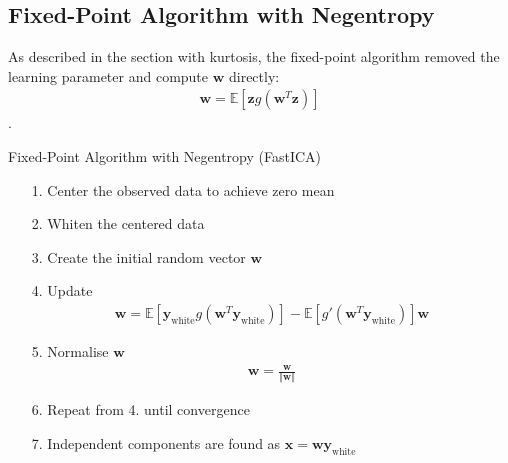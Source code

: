 \subsection{Fixed-Point Algorithm with Negentropy}
As described in the section with kurtosis, the fixed-point algorithm removed the learning parameter and compute $\mathbf{w}$ directly:
\begin{align*}
\mathbf{w} = \mathbb{E}[\mathbf{z} g(\mathbf{w}^T \mathbf{z})]
\end{align*}
.
\begin{algorithm}[H]
\caption{Fixed-Point Algorithm with Negentropy (FastICA)}
\begin{itemize}
\item[1.] Center the observed data to achieve zero mean
\item[2.] Whiten the centered data
\item[3.] Create the initial random vector $\mathbf{w}$
\item[4.] Update
\begin{align*}
\mathbf{w} = \mathbb{E}[ \mathbf{y}_{\text{white}} g(\mathbf{w}^T \mathbf{y}_{\text{white}})] - \mathbb{E}[g'(\mathbf{w}^T \mathbf{y}_{\text{white}})] \mathbf{w}
\end{align*}
\item[5.] Normalise $\mathbf{w}$
\begin{align*}
\mathbf{w} = \frac{\mathbf{w}}{\Vert \mathbf{w} \Vert}
\end{align*}
\item[6.] Repeat from 4. until convergence
\item[7.] Independent components are found as $\mathbf{x} = \mathbf{w} \mathbf{y}_{\text{white}}$
\end{itemize}
\end{algorithm}


